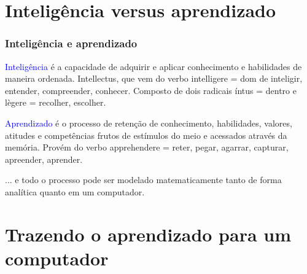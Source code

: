 \documentclass[aspectratio=169]{beamer} %
\begin{document}
\section{Inteligência versus aprendizado}

\begin{frame}
	\frametitle{Inteligência e aprendizado}
	\pause
	\begin{tcolorbox}[colback=gray!5,colframe=blue!40!black,title=Inteligência]
		\justifying
		\textcolor{blue}{Inteligência} é a capacidade de adquirir e aplicar conhecimento e habilidades de maneira ordenada. 
		Intellectus, que vem do verbo intelligere = dom de inteligir, entender, compreender, conhecer. Composto de dois radicais íntus = dentro e lègere = recolher, escolher.
    \end{tcolorbox}
\pause
	\begin{tcolorbox}[colback=gray!5,colframe=blue!40!black,title=Aprendizado]
		\justifying
		\textcolor{blue}{Aprendizado} é o processo de retenção de conhecimento, habilidades, valores, atitudes e competências frutos de estímulos do meio e acessados através da memória. 
		Provém do verbo apprehendere = reter, pegar, agarrar, capturar, apreender, aprender.
	\end{tcolorbox}
	\pause
	... e todo o processo pode ser modelado matematicamente tanto de forma analítica quanto em um computador.
\end{frame}


\section{Trazendo o aprendizado para um computador}
\end{document}
